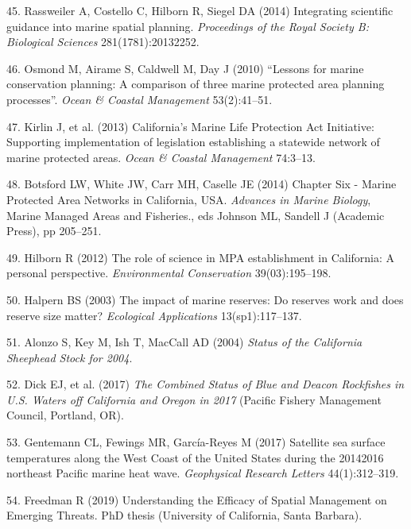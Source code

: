 \documentclass[9pt,twocolumn,twoside,lineno]{pnas-new}
\begin{document}
\leavevmode\hypertarget{ref-rassweiler2014}{}%
45. Rassweiler A, Costello C, Hilborn R, Siegel DA (2014) Integrating
scientific guidance into marine spatial planning. \emph{Proceedings of
the Royal Society B: Biological Sciences} 281(1781):20132252.

\leavevmode\hypertarget{ref-osmond2010}{}%
46. Osmond M, Airame S, Caldwell M, Day J (2010) ``Lessons for marine
conservation planning: A comparison of three marine protected area
planning processes''. \emph{Ocean \& Coastal Management} 53(2):41--51.

\leavevmode\hypertarget{ref-kirlin2013}{}%
47. Kirlin J, et al. (2013) California's Marine Life Protection Act
Initiative: Supporting implementation of legislation establishing a
statewide network of marine protected areas. \emph{Ocean \& Coastal
Management} 74:3--13.

\leavevmode\hypertarget{ref-botsford2014}{}%
48. Botsford LW, White JW, Carr MH, Caselle JE (2014) Chapter Six -
Marine Protected Area Networks in California, USA. \emph{Advances in
Marine Biology}, Marine Managed Areas and Fisheries., eds Johnson ML,
Sandell J (Academic Press), pp 205--251.

\leavevmode\hypertarget{ref-hilborn2012}{}%
49. Hilborn R (2012) The role of science in MPA establishment in
California: A personal perspective. \emph{Environmental Conservation}
39(03):195--198.

\leavevmode\hypertarget{ref-halpern2003a}{}%
50. Halpern BS (2003) The impact of marine reserves: Do reserves work
and does reserve size matter? \emph{Ecological Applications}
13(sp1):117--137.

\leavevmode\hypertarget{ref-alonzo2004}{}%
51. Alonzo S, Key M, Ish T, MacCall AD (2004) \emph{Status of the
California Sheephead Stock for 2004}.

\leavevmode\hypertarget{ref-dick2017}{}%
52. Dick EJ, et al. (2017) \emph{The Combined Status of Blue and Deacon
Rockfishes in U.S. Waters off California and Oregon in 2017} (Pacific
Fishery Management Council, Portland, OR).

\leavevmode\hypertarget{ref-gentemann2017}{}%
53. Gentemann CL, Fewings MR, García-Reyes M (2017) Satellite sea
surface temperatures along the West Coast of the United States during
the 20142016 northeast Pacific marine heat wave. \emph{Geophysical
Research Letters} 44(1):312--319.

\leavevmode\hypertarget{ref-freedman2019}{}%
54. Freedman R (2019) Understanding the Efficacy of Spatial Management
on Emerging Threats. PhD thesis (University of California, Santa
Barbara).
\end{document}
